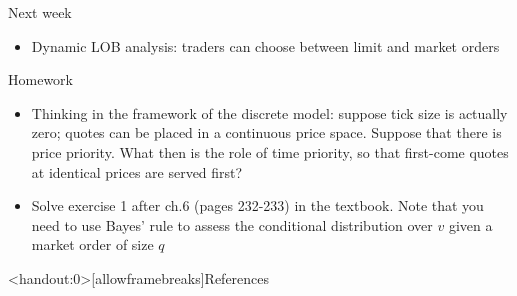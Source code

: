 \documentclass[english,10pt
,aspectratio=169
]{beamer}
\begin{document}
\begin{frame}{Next week}
	\begin{itemize}
		\item Dynamic LOB analysis: traders can choose between limit and market orders
	\end{itemize}
\end{frame}


\begin{frame}{Homework}
	\begin{itemize}
		\item Thinking in the framework of the discrete model: suppose tick size is actually zero; quotes can be placed in a continuous price space. Suppose that there is price priority. What then is the role of time priority, so that first-come quotes at identical prices are served first?
		\item Solve exercise 1 after ch.6 (pages 232-233) in the textbook. Note that you need to use Bayes' rule to assess the conditional distribution over $v$ given a market order of size $q$
	\end{itemize}
\end{frame}





\appendix
\begin{frame}<handout:0>[allowframebreaks]{References}
	
	
\end{frame}
\end{document}
